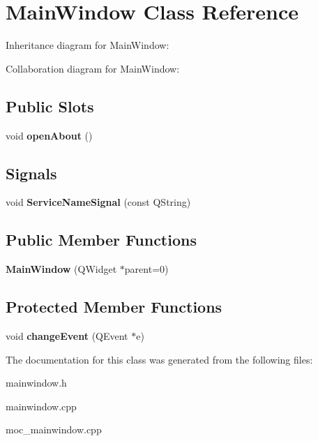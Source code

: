 \hypertarget{classMainWindow}{}\section{Main\+Window Class Reference}
\label{classMainWindow}


Inheritance diagram for Main\+Window\+:


Collaboration diagram for Main\+Window\+:
\subsection*{Public Slots}
\begin{DoxyCompactItemize}
\item 
void {\bfseries open\+About} ()\hypertarget{classMainWindow_a06bcc3ac679ebab877652fc0d69744ea}{}\label{classMainWindow_a06bcc3ac679ebab877652fc0d69744ea}

\end{DoxyCompactItemize}
\subsection*{Signals}
\begin{DoxyCompactItemize}
\item 
void {\bfseries Service\+Name\+Signal} (const Q\+String)\hypertarget{classMainWindow_ae5327ca7924fc54afdbc88a1c510cd52}{}\label{classMainWindow_ae5327ca7924fc54afdbc88a1c510cd52}

\end{DoxyCompactItemize}
\subsection*{Public Member Functions}
\begin{DoxyCompactItemize}
\item 
{\bfseries Main\+Window} (Q\+Widget $\ast$parent=0)\hypertarget{classMainWindow_a8b244be8b7b7db1b08de2a2acb9409db}{}\label{classMainWindow_a8b244be8b7b7db1b08de2a2acb9409db}

\end{DoxyCompactItemize}
\subsection*{Protected Member Functions}
\begin{DoxyCompactItemize}
\item 
void {\bfseries change\+Event} (Q\+Event $\ast$e)\hypertarget{classMainWindow_af4ca5d0d3d18ddcb7d54b6596bbf4797}{}\label{classMainWindow_af4ca5d0d3d18ddcb7d54b6596bbf4797}

\end{DoxyCompactItemize}


The documentation for this class was generated from the following files\+:\begin{DoxyCompactItemize}
\item 
mainwindow.\+h\item 
mainwindow.\+cpp\item 
moc\+\_\+mainwindow.\+cpp\end{DoxyCompactItemize}
